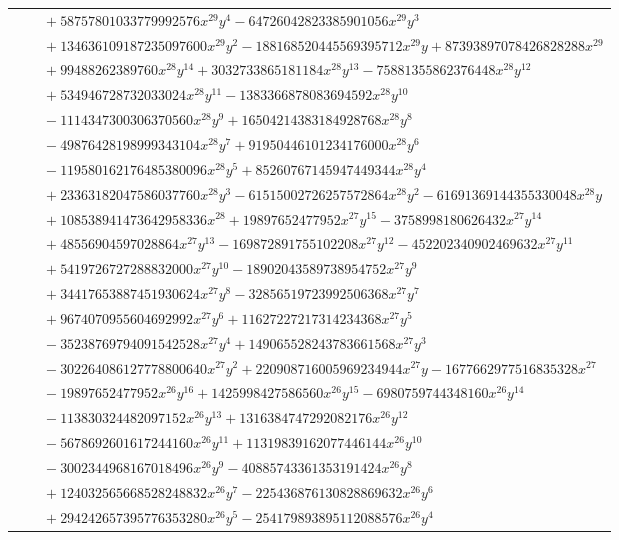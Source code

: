 \documentclass[11pt]{article}
\begin{document}
\begin{longtable}{@{}ll@{}}
 & $\quad +58757801033779992576x^{29}y^{4}-64726042823385901056x^{29}y^{3}$\\
 & $\quad +134636109187235097600x^{29}y^{2}-188168520445569395712x^{29}y+87393897078426828288x^{29}$\\
 & $\quad +99488262389760x^{28}y^{14}+3032733865181184x^{28}y^{13}-75881355862376448x^{28}y^{12}$\\
 & $\quad +534946728732033024x^{28}y^{11}-1383366878083694592x^{28}y^{10}$\\
 & $\quad -1114347300306370560x^{28}y^{9}+16504214383184928768x^{28}y^{8}$\\
 & $\quad -49876428198999343104x^{28}y^{7}+91950446101234176000x^{28}y^{6}$\\
 & $\quad -119580162176485380096x^{28}y^{5}+85260767145947449344x^{28}y^{4}$\\
 & $\quad +23363182047586037760x^{28}y^{3}-61515002726257572864x^{28}y^{2}-61691369144355330048x^{28}y$\\
 & $\quad +108538941473642958336x^{28}+19897652477952x^{27}y^{15}-3758998180626432x^{27}y^{14}$\\
 & $\quad +48556904597028864x^{27}y^{13}-169872891755102208x^{27}y^{12}-452202340902469632x^{27}y^{11}$\\
 & $\quad +5419726727288832000x^{27}y^{10}-18902043589738954752x^{27}y^{9}$\\
 & $\quad +34417653887451930624x^{27}y^{8}-32856519723992506368x^{27}y^{7}$\\
 & $\quad +9674070955604692992x^{27}y^{6}+11627227217314234368x^{27}y^{5}$\\
 & $\quad -35238769794091542528x^{27}y^{4}+149065528243783661568x^{27}y^{3}$\\
 & $\quad -302264086127778800640x^{27}y^{2}+220908716005969234944x^{27}y-1677662977516835328x^{27}$\\
 & $\quad -19897652477952x^{26}y^{16}+1425998427586560x^{26}y^{15}-6980759744348160x^{26}y^{14}$\\
 & $\quad -113830324482097152x^{26}y^{13}+1316384747292082176x^{26}y^{12}$\\
 & $\quad -5678692601617244160x^{26}y^{11}+11319839162077446144x^{26}y^{10}$\\
 & $\quad -3002344968167018496x^{26}y^{9}-40885743361353191424x^{26}y^{8}$\\
 & $\quad +124032565668528248832x^{26}y^{7}-225436876130828869632x^{26}y^{6}$\\
 & $\quad +294242657395776353280x^{26}y^{5}-254179893895112088576x^{26}y^{4}$\\

\end{longtable}
\end{document}
